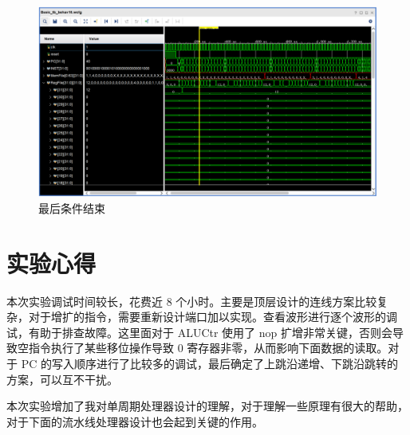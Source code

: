 \documentclass[a4paper,UTF8]{ctexart}
\begin{document}
\begin{figure}[H]
    \centering
    \includegraphics[width=\textwidth]{memdetail.png}
    \caption{最后条件结束}
    \label{fig:cond}
\end{figure}

\section{实验心得}

本次实验调试时间较长，花费近 8 个小时。主要是顶层设计的连线方案比较复杂，对于增扩的指令，需要重新设计端口加以实现。查看波形进行逐个波形的调试，有助于排查故障。这里面对于 ALUCtr 使用了 nop 扩增非常关键，否则会导致空指令执行了某些移位操作导致 0 寄存器非零，从而影响下面数据的读取。对于 PC 的写入顺序进行了比较多的调试，最后确定了上跳沿递增、下跳沿跳转的方案，可以互不干扰。

本次实验增加了我对单周期处理器设计的理解，对于理解一些原理有很大的帮助，对于下面的流水线处理器设计也会起到关键的作用。
\end{document}
